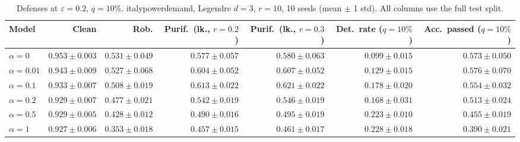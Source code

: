 \begin{table}[htbp]
  \centering
  \small
  \begin{tabular}{@{}lrrrrrr@{}}
    \toprule
    Model & Clean & Rob. & Purif.\ (lk., $r{=}0.2$) & Purif.\ (lk., $r{=}0.3$) & Det.\ rate ($q{=}10\%$) & Acc.\ passed ($q{=}10\%$) \\
    \midrule
    $\alpha{=}0$ & $\mathbf{0.953 \pm 0.003}$ & $\mathbf{0.531 \pm 0.049}$ & $0.577 \pm 0.057$ & $0.580 \pm 0.063$ & $0.099 \pm 0.015$ & $0.573 \pm 0.050$ \\
    $\alpha{=}0.01$ & $0.943 \pm 0.009$ & $0.527 \pm 0.068$ & $0.604 \pm 0.052$ & $0.607 \pm 0.052$ & $0.129 \pm 0.015$ & $\mathbf{0.576 \pm 0.070}$ \\
    $\alpha{=}0.1$ & $0.933 \pm 0.007$ & $0.508 \pm 0.019$ & $\mathbf{0.613 \pm 0.022}$ & $\mathbf{0.621 \pm 0.022}$ & $0.178 \pm 0.020$ & $0.554 \pm 0.032$ \\
    $\alpha{=}0.2$ & $0.929 \pm 0.007$ & $0.477 \pm 0.021$ & $0.542 \pm 0.019$ & $0.546 \pm 0.019$ & $0.168 \pm 0.031$ & $0.513 \pm 0.024$ \\
    $\alpha{=}0.5$ & $0.929 \pm 0.005$ & $0.428 \pm 0.012$ & $0.490 \pm 0.016$ & $0.495 \pm 0.019$ & $0.223 \pm 0.010$ & $0.455 \pm 0.019$ \\
    $\alpha{=}1$ & $0.927 \pm 0.006$ & $0.353 \pm 0.018$ & $0.457 \pm 0.015$ & $0.461 \pm 0.017$ & $\mathbf{0.228 \pm 0.018}$ & $0.390 \pm 0.021$ \\
    \bottomrule
  \end{tabular}
  \caption{Defenses at $\varepsilon=0.2$, $q{=}10\%$. italypowerdemand, Legendre $d{=}3$, $r{=}10$, 10 seeds (mean $\pm$ 1 std). All columns use the full test split.}
  \label{tab:italypowerdemand_models_r10_eps0.2}
\end{table}
